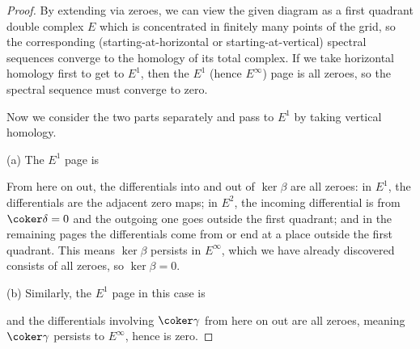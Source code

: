 \documentclass[10pt]{article}
\begin{document}
\begin{proof}
    By extending via zeroes, we can view the given diagram
    as a first quadrant double complex $E$ which is concentrated in
    finitely many points of the grid,
    so the corresponding (starting-at-horizontal or starting-at-vertical)
    spectral sequences converge to the homology of its total complex.
    If we take horizontal homology first to get to $E^1$,
    then the $E^1$ (hence $E^\infty$) page is all zeroes,
    so the spectral sequence must converge to zero.

    Now we consider the two parts separately and
    pass to $E^1$ by taking vertical homology.

    (a) The $E^1$ page is
    \begin{center}
    \end{center}
    From here on out, the differentials into and out of $\ker\beta$
    are all zeroes: in $E^1$, the differentials
    are the adjacent zero maps; in $E^2$, the incoming differential
    is from $\coker\delta = 0$ and the outgoing one
    goes outside the first quadrant; and in the remaining pages
    the differentials come from or end at a place outside the first quadrant.
    This means $\ker\beta$ persists in $E^\infty$,
    which we have already discovered consists of all zeroes,
    so $\ker\beta = 0$.

    (b) Similarly, the $E^1$ page in this case is
    \begin{center}
    \end{center}
    and the differentials involving $\coker\gamma$ from here on out
    are all zeroes, meaning $\coker\gamma$ persists to $E^\infty$,
    hence is zero.
\end{proof}
\end{document}
